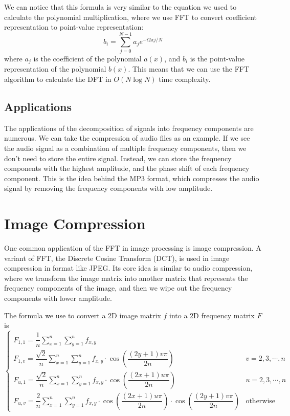 \documentclass[a4paper,12pt]{article}
\begin{document}
We can notice that this formula is very similar to the equation we used to calculate the polynomial multiplication, where we use FFT to convert coefficient representation to point-value representation:
\begin{equation*}
	b_i = \sum_{j=0}^{N-1} a_j e^{-i2\pi j/N}
\end{equation*}
where $a_j$ is the coefficient of the polynomial $a(x)$, and $b_i$ is the point-value representation of the polynomial $b(x)$.
This means that we can use the FFT algorithm to calculate the DFT in $O(N\log N)$ time complexity.

\subsection{Applications}

The applications of the decomposition of signals into frequency components are numerous.
We can take the compression of audio files as an example.
If we see the audio signal as a combination of multiple frequency components, then we don't need to store the entire signal.
Instead, we can store the frequency components with the highest amplitude, and the phase shift of each frequency component.
This is the idea behind the MP3 format, which compresses the audio signal by removing the frequency components with low amplitude.

\section{Image Compression}

One common application of the FFT in image processing is image compression.
A variant of FFT, the Discrete Cosine Transform (DCT), is used in image compression in format like JPEG.
Its core idea is similar to audio compression, where we transform the image matrix into another matrix that represents the frequency components of the image, and then we wipe out the frequency components with lower amplitude.

The formula we use to convert a 2D image matrix $f$ into a 2D frequency matrix $F$ is
\begin{equation*}
	\begin{cases}
		F_{1, 1} = \dfrac1n\sum\limits_{x=1}^n\sum\limits_{y=1}^nf_{x, y} & \\
		F_{1, v} = \dfrac{\sqrt2}n\sum\limits_{x=1}^n\sum\limits_{y=1}^nf_{x, y}\cdot\cos\left(\dfrac{(2y+1)v\pi}{2n}\right) & v = 2, 3, \cdots, n\\
		F_{u, 1} = \dfrac{\sqrt2}n\sum\limits_{x=1}^n\sum\limits_{y=1}^nf_{x, y}\cdot\cos\left(\dfrac{(2x+1)u\pi}{2n}\right) & u = 2, 3, \cdots, n\\
		F_{u, v} = \dfrac2n\sum\limits_{x=1}^n\sum\limits_{y=1}^nf_{x, y}\cdot\cos\left(\dfrac{(2x+1)u\pi}{2n}\right)\cdot\cos\left(\dfrac{(2y+1)v\pi}{2n}\right) & \text{otherwise}
	\end{cases}
\end{equation*}
\end{document}
